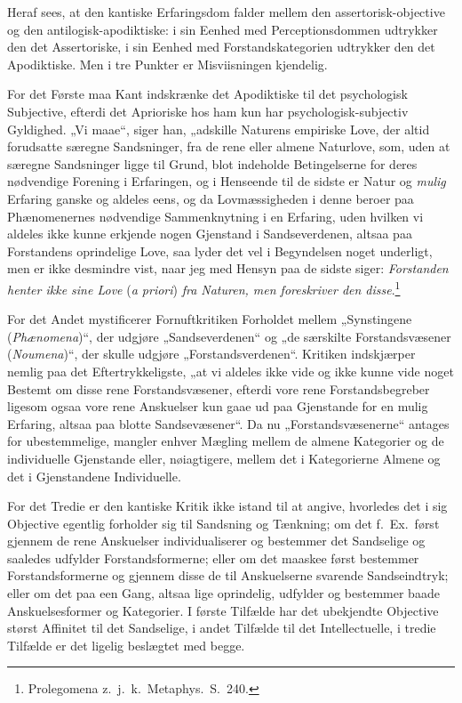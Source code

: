 \documentclass[12pt]{book}
\newcommand{\opage}[1]{\marginnote{\footnotesize\textit{[#1]}}}
\begin{document}
Heraf sees, at den kantiske Erfaringsdom falder mellem den assertorisk-objective og den antilogisk-apodiktiske: i sin Eenhed med Perceptionsdommen udtrykker den det Assertoriske, i sin Eenhed med Forstandskategorien udtrykker den det Apodiktiske. Men i tre Punkter er Misviisningen kjendelig.

For det Første maa Kant indskrænke det Apodiktiske til det psychologisk Subjective, efterdi det Aprioriske hos ham kun har psychologisk-subjectiv Gyldighed. „Vi maae“, siger han, „adskille Naturens empiriske Love, der altid forudsatte
særegne Sandsninger, fra de rene eller almene Naturlove, som, uden at særegne Sandsninger ligge til Grund, blot indeholde Betingelserne for deres nødvendige Forening i Erfaringen, og i Henseende til de sidste er Natur og \emph{mulig} Erfaring ganske og aldeles eens, og da Lovmæssigheden i denne beroer paa Phænomenernes nødvendige Sammenknytning i en Erfaring, uden hvilken vi aldeles ikke kunne erkjende nogen Gjenstand i Sandseverdenen, altsaa paa Forstandens oprindelige Love, saa lyder det vel i Begyndelsen noget underligt, men er ikke desmindre vist, naar jeg med Hensyn paa de sidste siger: \emph{Forstanden henter ikke sine Love} (\textit{a priori}) \emph{fra Naturen, men foreskriver den disse}.\footnote{Prolegomena z.\ j.\ k.\ Metaphys.\ S.~240.}%

For det Andet mystificerer Fornuftkritiken Forholdet mellem „Synstingene (\textit{Phænomena})“, der udgjøre „Sandseverdenen“ og „de særskilte Forstandsvæsener (\textit{Noumena})“, der skulle udgjøre „Forstandsverdenen“. Kritiken indskjærper nemlig paa det Eftertrykkeligste, „at vi aldeles ikke vide og ikke kunne vide noget Bestemt om disse rene Forstandsvæsener, efterdi vore rene Forstandsbegreber ligesom ogsaa vore rene
\opage{270}Anskuelser kun gaae ud paa Gjenstande for en mulig Erfaring, altsaa paa blotte Sandsevæsener“. Da nu „Forstandsvæsenerne“ antages for ubestemmelige, mangler enhver Mægling mellem de almene Kategorier og de individuelle Gjenstande eller, nøiagtigere, mellem det i Kategorierne Almene og det i Gjenstandene Individuelle.

For det Tredie er den kantiske Kritik ikke istand til at angive, hvorledes det i sig Objective egentlig forholder sig til Sandsning og Tænkning; om det f.\ Ex.\ først gjennem de rene Anskuelser individualiserer og bestemmer det Sandselige og saaledes udfylder Forstandsformerne; eller om det maaskee først bestemmer Forstandsformerne og gjennem disse de til Anskuelserne svarende Sandseindtryk; eller om det paa een Gang, altsaa lige oprindelig, udfylder og bestemmer baade Anskuelsesformer og Kategorier. I første Tilfælde har det ubekjendte Objective størst Affinitet til det Sandselige, i andet Tilfælde til det Intellectuelle, i tredie Tilfælde er det ligelig beslægtet med begge.
\end{document}
